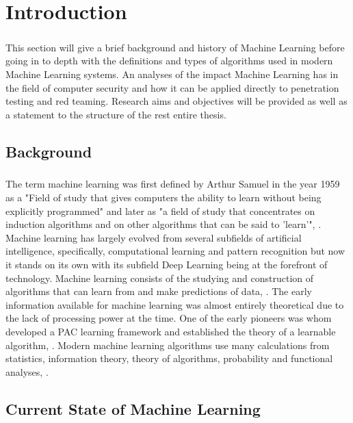 \chapter{Introduction}
\label{chap:chapter1}

\paragraph{}This section will give a brief background and history of Machine Learning before going in to depth with the definitions and types of algorithms used in modern Machine Learning systems. An analyses of the impact Machine Learning has in the field of computer security and how it can be applied directly to penetration testing and red teaming. Research aims and objectives will be provided as well as a statement to the structure of the rest entire thesis.

\section{Background}
\label{sec:section1}

\paragraph{}The term machine learning was first defined by Arthur Samuel in the year 1959 as a "Field of study that gives computers the ability to learn without being explicitly programmed" and later as "a field of study that concentrates on induction algorithms and on other algorithms that can be said to 'learn'", \cite{ronKohavi}. Machine learning has largely evolved from several subfields of artificial intelligence, specifically, computational learning and pattern recognition but now it stands on its own with its subfield Deep Learning being at the forefront of technology. Machine learning consists of the studying and construction of algorithms that can learn from and make predictions of data, \cite{bigData}. The early information available for machine learning was almost entirely theoretical due to the lack of processing power at the time. One of the early pioneers was \cite{Valiant} whom developed a PAC learning framework and established the theory of a learnable algorithm, \cite{mlOpt}.  Modern machine learning algorithms use many calculations from statistics, information theory, theory of algorithms, probability and functional analyses, \cite{mlOpt}.

\section{Current State of Machine Learning}
\label{sec:section2}

